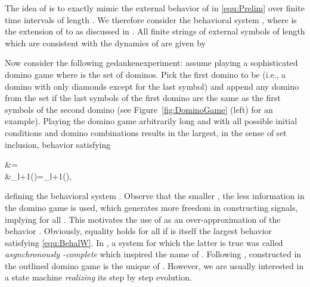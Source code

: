 

The idea of \SAlA is to exactly mimic the external behavior of  in \eqref{equ:Prelim} over finite time intervals of length . 
We therefore consider the behavioral system , where  is the extension of  to  as discussed in . 
All finite strings of external symbols of length  which are consistent with the dynamics of  are given by

Now consider the following gedankenexperiment: assume playing a sophisticated domino game where  is the set of dominos. Pick the first domino to be  (i.e., a domino with only diamonds except for the last symbol) and append any domino from the set  if the last  symbols of the first domino are the same as the first  symbols of the second domino (see Figure~\ref{fig:DominoGame} (left) for an example).
Playing the domino game arbitrarily long and with all possible initial conditions and domino combinations results in the largest, in the sense of set inclusion, behavior  satisfying 

 &\Behal{}=\BeheQ{}~~\label{equ:BehalW:a}\\
 &\Pi_{l+1}(\Behal)=\Pi_{l+1}(\BeheQ), \label{equ:BehalW:b}
 
defining the behavioral system .
Observe that the smaller , the less information in the domino game is used, which generates more freedom in constructing signals, implying  for all . 
This motivates the use of  as an over-approximation of the behavior .
Obviously, equality  holds for all  if  is itself the largest behavior satisfying \eqref{equ:BehalW}. In \cite{SchmuckRaisch2014_ControlLetters}, a system  for which the latter is true was called \emph{asynchronously -complete} which inspired the name of \SAlA. Following \cite{SchmuckRaisch2014_ControlLetters},  constructed in the outlined domino game is the unique \SAlA of .  However, we are usually interested in a state machine \emph{realizing} its step by step evolution.

